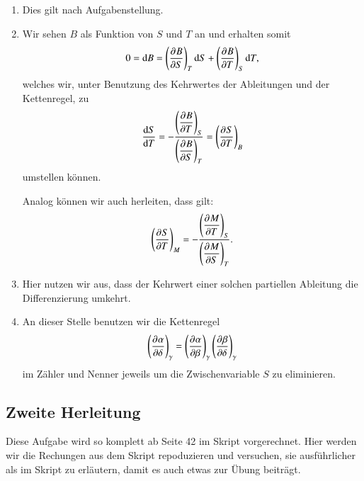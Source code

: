 \begin{enumerate}
    \item
        \label{1-1}
        Dies gilt nach Aufgabenstellung.

    \item
        \label{1-2}
        Wir sehen $B$ als Funktion von $S$ und $T$ an und erhalten somit
        \[
            0 = \dif B = \tdpd BST \dif S + \tdpd BTS \dif T,
        \]
        welches wir, unter Benutzung des Kehrwertes der Ableitungen und der
        Kettenregel, zu
        \[
            \frac{\dif S}{\dif T} = - \frac{\tdpd BTS}{\tdpd BST} = \tdpd STB
        \]
        umstellen können.

        Analog können wir auch herleiten, dass gilt:
        \[
            \tdpd STM = - \frac{\tdpd MTS}{\tdpd MST}.
        \]

    \item
        \label{1-3}
        Hier nutzen wir aus, dass der Kehrwert einer solchen partiellen
        Ableitung die Differenzierung umkehrt.

    \item
        \label{1-4}
        An dieser Stelle benutzen wir die Kettenregel
        \[
            \tdpd \alpha\delta\gamma = \tdpd \alpha\beta\gamma \tdpd \beta\delta\gamma
        \]
        im Zähler und Nenner jeweils um die Zwischenvariable $S$ zu
        eliminieren.
\end{enumerate}

\subsection{Zweite Herleitung}

Diese Aufgabe wird so komplett ab Seite 42 im Skript vorgerechnet. Hier werden
wir die Rechungen aus dem Skript repoduzieren und versuchen, sie ausführlicher
als im Skript zu erläutern, damit es auch etwas zur Übung beiträgt.

